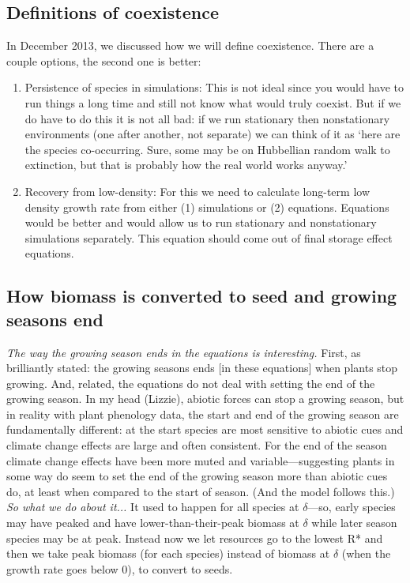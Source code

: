 \documentclass[11pt,a4paper,oneside]{article}
\begin{document}
\subsection{Definitions of coexistence}
\noindent In December 2013, we discussed how we will define coexistence. There are a couple options, the second one is better:
\begin{enumerate}
\item Persistence of species in simulations: This is not ideal since you would have to run things a long time and still not know what would truly coexist. But if we do have to do this it is not all bad: if we run stationary then nonstationary environments (one after another, not separate) we can think of it as `here are the species co-occurring. Sure, some may be on Hubbellian random walk to extinction, but that is probably how the real world works anyway.' 
\item Recovery from low-density: For this we need to calculate long-term low density growth rate from either (1) simulations or (2) equations. Equations would be better and would allow us to run stationary and nonstationary simulations separately. This equation should come out of final storage effect equations.
\end{enumerate}


\subsection{How biomass is converted to seed and growing seasons end}


\noindent \emph{The way the growing season ends in the equations is
interesting.} First, as brilliantly stated: the growing seasons ends
[in these equations] when plants stop growing. And, related, the
equations do not deal with setting the end of the growing season. In
my head (Lizzie), abiotic forces can stop a growing season, but in
reality with plant phenology data, the start and end of the growing
season are fundamentally different: at the start species are most
sensitive to abiotic cues and climate change effects are large and
often consistent. For the end of the season climate change effects have been more
muted and variable---suggesting plants in some way do seem to set the
end of the growing season more than abiotic cues do, at least when
compared to the start of season. (And the model follows this.)\\

\noindent \emph{So what we do about it...} It used to happen for all species at $\delta$---so, early species may have peaked and have lower-than-their-peak biomass at $\delta$ while later season species may be at peak. Instead now we let resources go to  the lowest R* and then we take peak biomass (for each species) instead of biomass at $\delta$ (when the growth rate goes below 0), to convert to seeds.
\end{document}
